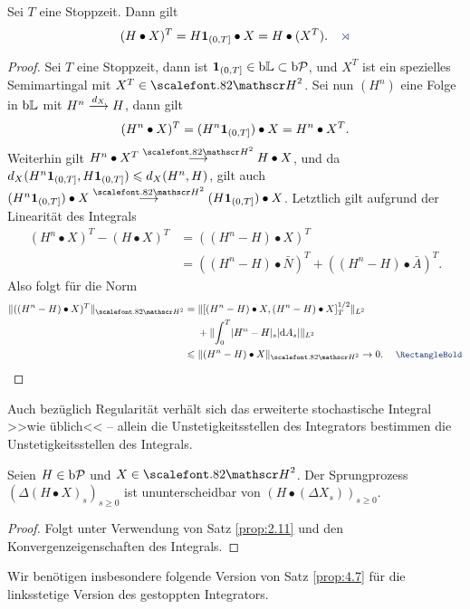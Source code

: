 \begin{theorem}
\label{prop:4.7}
Sei $T$ eine Stoppzeit. Dann gilt
\begin{align*}
(H \bullet X)^T = H\Id_{(0,T]} \bullet X = H \bullet (X^T).\fish
\end{align*}
\end{theorem}
\begin{proof}
Sei $T$ eine Stoppzeit, dann ist $\mathbf{1}_{(0,T]}\in \mathrm{b}\mathbb{L}\subset \mathrm{b}\mathcal{P}$, und
$X^T$ ist ein spezielles Semimartingal mit $X^T\in\HH^2$. Sei nun $(H^n)$
eine Folge in $\mathrm{b}\mathbb{L}$ mit $H^n\overset{d_{X}}{\longrightarrow} H$, dann gilt
\begin{align*}
(H^n\bullet X)^T = (H^n\mathbf{1}_{(0,T]})\bullet X = H^n\bullet X^T.
\end{align*}
Weiterhin gilt $H^n\bullet X^T \Hto H\bullet X$, und da
$d_X(H^n\mathbf{1}_{(0,T]},H\mathbf{1}_{(0,T]}) \leqslant d_X(H^n,H)$, gilt auch
$(H^n\Id_{(0,T]})\bullet X\Hto (H\Id_{(0,T]})\bullet X$. Letztlich gilt aufgrund
der Linearität des Integrals
\begin{align*}
(H^n\bullet X)^T - (H\bullet X)^T &= ((H^n-H)\bullet X)^T \\ &= ((H^n-H)\bullet
\bar{N})^T + ((H^n-H)\bullet \bar{A})^T.
\end{align*}
Also folgt für die Norm
\begin{align*}
\norm{((H^n-H)\bullet X)^T}_{\HH^2} &=
\norm{[(H^n-H)\bullet X,(H^n-H)\bullet X]_T^{1/2}}_{L^2}\\
&\quad\; +
\norm{\int_0^T \abs{H^n-H}_s \abs{\dA_s}}_{L^2}\\
&\le \norm{(H^n-H)\bullet X}_{\HH^2} \to 0.\qed 
\end{align*}
\end{proof}

Auch bezüglich Regularität verhält sich das erweiterte stochastische Integral
>>wie üblich<< -- allein die Unstetigkeitsstellen des Integrators bestimmen die
Unstetigkeitsstellen des Integrals.

\begin{theorem}
\label{prop:4.8}
Seien $H \in \mathrm{b}\mathcal{P}$ und $X \in \HH^2$. Der Sprungprozess $\left( \Delta
    (H\bullet X)_s \right)_{s\ge 0} $ ist ununterscheidbar von $\left(H\bullet
    (\Delta X_s) \right)_{s\ge 0}$.\fish
\end{theorem}
\begin{proof}
Folgt unter Verwendung von Satz \ref{prop:2.11} und den Konvergenzeigenschaften
des Integrals.\fish
\end{proof}

Wir benötigen insbesondere folgende Version von Satz \ref{prop:4.7} für die
linksstetige Version des gestoppten Integrators.

